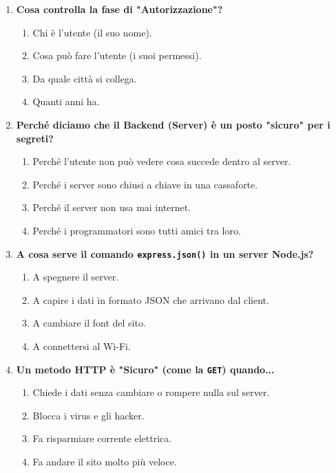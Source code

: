 \documentclass[11pt,a4paper]{article}
\begin{document}
\begin{enumerate}[label=\textbf{\arabic*.}, leftmargin=1.5em, itemsep=1.5em]
    \item \textbf{Cosa controlla la fase di "Autorizzazione"?}
    \begin{enumerate}[label=\alph*)]
        \item Chi è l'utente (il suo nome).
        \item Cosa può fare l'utente (i suoi permessi).
        \item Da quale città si collega.
        \item Quanti anni ha.
    \end{enumerate}

    \item \textbf{Perché diciamo che il Backend (Server) è un posto "sicuro" per i segreti?}
    \begin{enumerate}[label=\alph*)]
        \item Perché l'utente non può vedere cosa succede dentro al server.
        \item Perché i server sono chiusi a chiave in una cassaforte.
        \item Perché il server non usa mai internet.
        \item Perché i programmatori sono tutti amici tra loro.
    \end{enumerate}

    \item \textbf{A cosa serve il comando \texttt{express.json()} in un server Node.js?}
    \begin{enumerate}[label=\alph*)]
        \item A spegnere il server.
        \item A capire i dati in formato JSON che arrivano dal client.
        \item A cambiare il font del sito.
        \item A connettersi al Wi-Fi.
    \end{enumerate}

    \item \textbf{Un metodo HTTP è "Sicuro" (come la \texttt{GET}) quando...}
    \begin{enumerate}[label=\alph*)]
        \item Chiede i dati senza cambiare o rompere nulla sul server.
        \item Blocca i virus e gli hacker.
        \item Fa risparmiare corrente elettrica.
        \item Fa andare il sito molto più veloce.
    \end{enumerate}


\end{enumerate}
\end{document}

